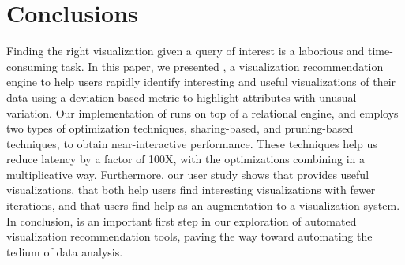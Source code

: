 
\section{Conclusions}
\label{sec:conc}

Finding the right visualization given a query of interest is a
laborious and time-consuming task.
In this paper, we presented \SeeDB, a visualization recommendation
engine to help users 
rapidly identify interesting and useful visualizations of their data using a deviation-based 
metric to highlight attributes with unusual variation.
Our implementation of \SeeDB runs on top of a relational engine, and employs two types of optimization 
techniques, sharing-based, and pruning-based techniques, to obtain near-interactive performance.
These techniques help us reduce latency by a factor of 100X, with the optimizations combining in a multiplicative way. 
Furthermore, our user study shows that \SeeDB provides useful
visualizations, that both help users find interesting visualizations with fewer iterations, and that
users find help as an augmentation to a visualization system.
In conclusion, \SeeDB is an important first step in our exploration of 
automated visualization recommendation tools, 
paving the way toward automating the tedium of data analysis.




